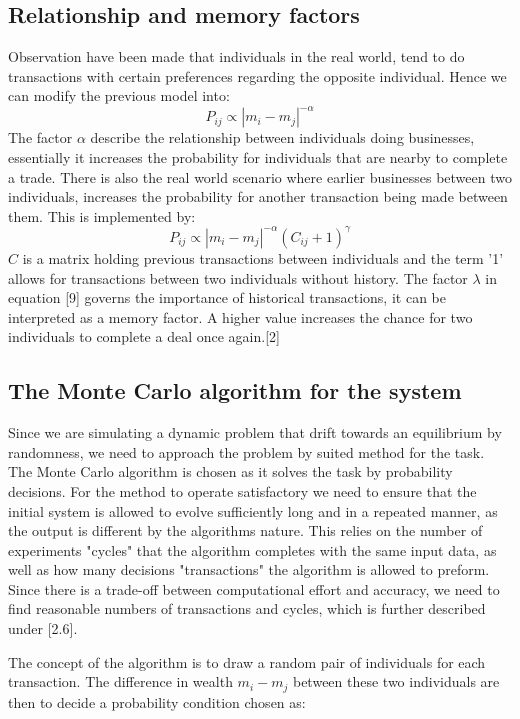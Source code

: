 \documentclass[a4paper,11pt]{article}
\begin{document}
	\subsection{Relationship and memory factors}
Observation have been made that individuals in the real world, tend to do transactions with certain preferences regarding the opposite individual. Hence we can modify the previous model into:
\begin{equation}
	P_{ij} \propto |m_i-m_j|^{-\alpha}
\end{equation}
The factor $\alpha$ describe the relationship between individuals doing businesses, essentially it increases the probability for individuals that are nearby to complete a trade. There is also the real world scenario where earlier businesses between two individuals, increases the probability for another transaction being made between them. This is implemented by:
\begin{equation}
	P_{ij} \propto |m_i-m_j|^{-\alpha}  (C_{ij}+1)^{\gamma}
\end{equation}
$C$ is a matrix holding previous transactions between individuals and the term '1' allows for transactions between two individuals without history. The factor $\lambda$ in equation [9] governs the importance of historical transactions, it can be interpreted as a memory factor. A higher value increases the chance for two individuals to complete a deal once again.[2]  

\subsection{The Monte Carlo algorithm for the system}
Since we are simulating a dynamic problem that drift towards an equilibrium by randomness, we need to approach the problem by suited method for the task. The Monte Carlo algorithm is chosen as it solves the task by probability decisions. For the method to operate satisfactory we need to ensure that the initial system is allowed to evolve sufficiently long and in a repeated manner, as the output is different by the algorithms nature. This relies on the number of experiments "cycles" that the algorithm completes with the same input data, as well as how many decisions "transactions" the algorithm is allowed to preform. Since there is a trade-off between computational effort and accuracy, we need to find reasonable numbers of transactions and cycles, which is further described under [2.6]. 
\\
\par
The concept of the algorithm is to draw a random pair of individuals for each transaction. The difference in wealth $m_i-m_j$ between these two individuals are then to decide a probability condition chosen as:
\end{document}
